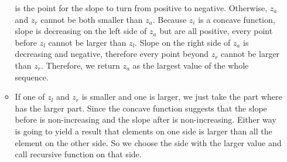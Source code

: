 \documentclass{article}
\begin{document}
\begin{enumerate}
\begin{itemize}
     is the point for the slope to turn from positive to negative. Otherwise, $z_a$ and $z_r$ cannot
     be both smaller than $z_a$. Because $z_i$ is a concave function, slope is decreasing on the left
     side of $z_a$ but are all positive, every point before $z_l$ cannot be larger than $z_l$. 
     Slope on the right side of $z_a$ is decreasing and negative, therefore every point beyond $z_r$ 
     cannot be larger than $z_r$. Therefore, we return $z_a$ as the largest value of the whole sequence.
     \item If one of $z_l$ and $z_r$ is smaller and one is larger, we just take the part where has the 
     larger part. Since the concave function suggests that the slope before is non-increasing and the
     slope after is non-increasing. Either way is going to yield a result that elements on one side 
     is larger than all the element on the other side. So we choose the side with the larger value and 
     call recursive function on that side. 
 \end{itemize}
\end{enumerate}
\end{document}

